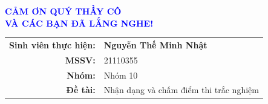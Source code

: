 \documentclass[10pt, aspectratio=169]{beamer}
\begin{document}
\begin{frame}[c] %
	\centering
	
	{\Huge \textcolor{blue}{\textbf{CẢM ƠN QUÝ THẦY CÔ}}} \\[0.2em]
	{\Huge \textcolor{blue}{\textbf{VÀ CÁC BẠN ĐÃ LẮNG NGHE!}}}
	
	\vspace{1cm}
	
	\vspace{1.2cm}
	
	\footnotesize
	\begin{tabular}{r l}
		\textbf{Sinh viên thực hiện:} & \textbf{Nguyễn Thế Minh Nhật} \\
		\textbf{MSSV:} & 21110355 \\
		\textbf{Nhóm:} & Nhóm 10 \\
		\textbf{Đề tài:} & Nhận dạng và chấm điểm thi trắc nghiệm
	\end{tabular}
	
\end{frame}
	
\end{document}
